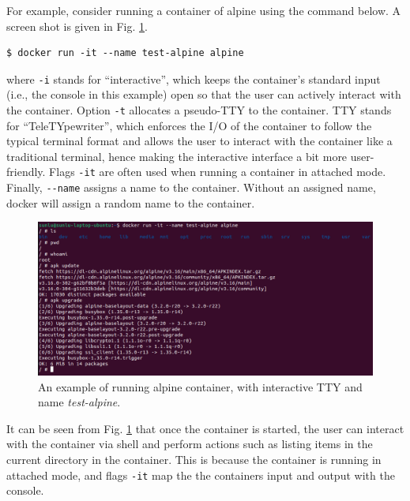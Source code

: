 For example, consider running a container of alpine using the command below. A screen shot is given in Fig. \ref{ch:vac:fig:dockerrunexp}.
\begin{lstlisting}
$ docker run -it --name test-alpine alpine
\end{lstlisting}
where \verb|-i| stands for ``interactive'', which keeps the container's standard input (i.e., the console in this example) open so that the user can actively interact with the container. Option \verb|-t| allocates a pseudo-TTY to the container. TTY stands for ``TeleTYpewriter'', which enforces the I/O of the container to follow the typical terminal format and allows the user to interact with the container like a traditional terminal, hence making the interactive interface a bit more user-friendly. Flags \verb|-it| are often used when running a container in attached mode. Finally, \verb|--name| assigns a name to the container. Without an assigned name, docker will assign a random name to the container.
\begin{figure}[!htb]
	\centering
	\includegraphics[width=350pt]{chapters/part-3/figures/dockerrunexp.png}
	\caption{An example of running alpine container, with interactive TTY and name \textit{test-alpine}.} \label{ch:vac:fig:dockerrunexp}
\end{figure}

It can be seen from Fig. \ref{ch:vac:fig:dockerrunexp} that once the container is started, the user can interact with the container via shell and perform actions such as listing items in the current directory in the container. This is because the container is running in attached mode, and flags \verb|-it| map the the containers input and output with the console.

